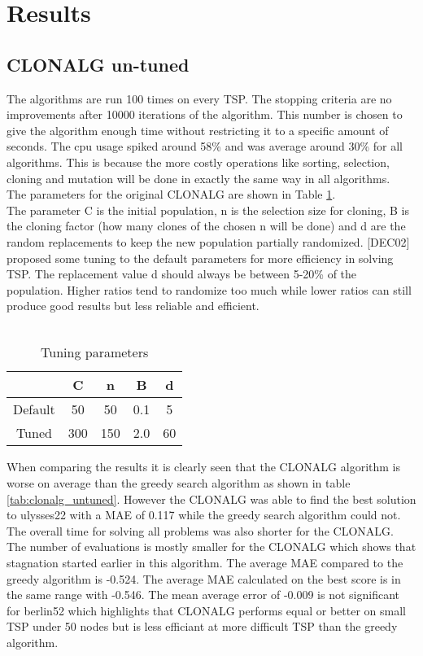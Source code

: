\section{Results}
\subsection{CLONALG un-tuned}
The algorithms are run 100 times on every TSP. The stopping criteria are no improvements after 10000 iterations of the algorithm. This number is chosen to give the algorithm enough time without restricting it to a specific amount of seconds. The cpu usage spiked around 58\% and was average around 30\% for all algorithms. This is because the more costly operations like sorting, selection, cloning and mutation will be done in exactly the same way in all algorithms.\\
The parameters for the original CLONALG are shown in Table \ref{tuning}.\\
The parameter C is the initial population, n is the selection size for cloning, B is the cloning factor (how many clones of the chosen n will be done) and d are the random replacements to keep the new population partially randomized. [DEC02] proposed some tuning to the default parameters for more efficiency in solving TSP. The replacement value d should always be between 5-20\% of the population. Higher ratios tend to randomize too much while lower ratios can still produce good results but less reliable and efficient.\\\\
\begin{table}[H]
	\begin{tabular}{|c|c|c|c|c|}
		\hline
		& C   & n   & B   & d  \\ \hline
		Default & 50  & 50  & 0.1 & 5  \\ \hline
		Tuned   & 300 & 150 & 2.0 & 60 \\ \hline
	\end{tabular}
	\caption{Tuning parameters}
	\label{tuning}
\end{table} 
\newpage
When comparing the results it is clearly seen that the CLONALG algorithm is worse on average than the greedy search algorithm as shown in table \ref{tab:clonalg_untuned}. However the CLONALG was able to find the best solution to ulysses22 with a MAE of 0.117 while the greedy search algorithm could not. The overall time for solving all problems was also shorter for the CLONALG. The number of evaluations is mostly smaller for the CLONALG which shows that stagnation started earlier in this algorithm. The average MAE compared to the greedy algorithm is -0.524. The average MAE calculated on the best score is in the same range with -0.546. The mean average error of -0.009 is not significant for berlin52 which highlights that CLONALG performs equal or better on small TSP under 50 nodes but is less efficiant at more difficult TSP than the greedy algorithm.
